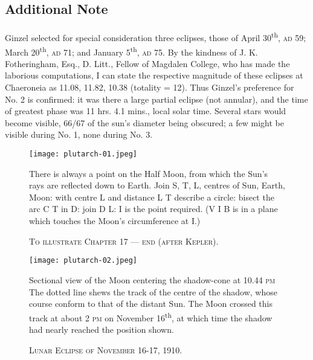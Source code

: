 \documentclass[a4paper, 11pt, oneside, polutonikogreek, english]{article}
\begin{document}
\bigskip
\centerline{\EightStarTaper}
\centerline{\EightStarTaper\EightStarTaper}
\bigskip

\subsection{Additional Note}
\paragraph{}
Ginzel selected for special consideration three eclipses, those of April 30\textsuperscript{th}, \textsc{ad} 59; March 20\textsuperscript{th}, \textsc{ad} 71; and January 5\textsuperscript{th}, \textsc{ad} 75. By the kindness of J. K. Fotheringham, Esq., D. Litt., Fellow of Magdalen College, who has made the laborious computations, I can state the respective magnitude of these eclipses at Chaeroneia as 11.08, 11.82, 10.38 (totality = 12). Thus Ginzel's preference for No. 2 is confirmed: it was there a large partial eclipse (not annular), and the time of greatest phase was 11 hrs. 4.1 mins., local solar time. Several stars would become visible, 66/67 of the sun's diameter being obscured; a few might be visible during No. 1, none during No. 3.
\clearpage
\vspace*{\fill}
\begin{figure}[H]
\centering
\texttt{[image: plutarch-01.jpeg]}
\caption{\textsc{To illustrate Chapter 17 --- end (after Kepler).}}
\footnotesize
There is always a point on the Half Moon, from which the Sun's rays are reflected down to Earth. Join S, T, L, centres of Sun, Earth, Moon: with centre L and distance L T describe a circle: bisect the arc C T in D: join D L: I is the point required. (V I B is in a plane which touches the Moon's circumference at I.)
\end{figure}
\vspace*{\fill}
\clearpage
\vspace*{\fill}
\begin{figure}[H]
\centering
\texttt{[image: plutarch-02.jpeg]}
\caption{\textsc{Lunar Eclipse of November 16-17, 1910.}}
\footnotesize
Sectional view of the Moon centering the shadow-cone at 10.44 \textsc{pm} The dotted line shews the track of the centre of the shadow, whose course conform to that of the distant Sun. The Moon crossed this track at about 2 \textsc{pm} on November 16\textsuperscript{th}, at which time the shadow had nearly reached the position shown.
\end{figure}
\vspace*{\fill}
\clearpage
\end{document}
